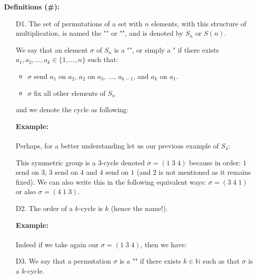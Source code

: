 	 \textbf{Definitions (\#\mydef):}
	 \begin{enumerate}
		\item[D1.] The set of permutations of a set with $n$ elements, with this structure of multiplication, is named the "" or "", and is denoted by $S_n$ or $S(n)$.
		
		We say that an element $\sigma$  of $S_n$ is a "", or simply a " if there exists $a_1,a_2,...,a_k\in \{1,...,n\}$ such that:
		\begin{itemize}
			\item $\sigma$ send $a_1$ on $a_2$, $a_2$ on $a_3$, ..., $a_{k-1}$, and $a_k$ on $a_1$.

			\item $\sigma$ fix all other elements of $S_n$
		\end{itemize}
		and we denote the cycle as following:
		
		\begin{tcolorbox}[colframe=black,colback=white,sharp corners]
		\textbf{{\Large {}}Example:}\\\\
		Perhaps, for a better understanding let us our previous example of $S_4$:
		
		This symmetric group is a $3$-cycle denoted $\sigma=(1\; 3\; 4)$ because in order: $1$ send on $3$, 3 send on $4$ and $4$ send on $1$ (and $2$ is not mentioned as it remains fixed). We can also write this in the following equivalent ways: $\sigma=(3\; 4\; 1)$ or also $\sigma=(4\; 1\; 3)$.
		\end{tcolorbox}

		\item[D2.] The order of a $k$-cycle is $k$ (hence the name!).
		\begin{tcolorbox}[colframe=black,colback=white,sharp corners]
		\textbf{{\Large {}}Example:}\\\\
		Indeed if we take again our $\sigma=(1\; 3\; 4)$, then we have:
		
		\end{tcolorbox}

		\item[D3.] We say that a permutation $\sigma$ is a "" if there exists $k\in \mathbb{N}$ such as that $\sigma$ is a $k$-cycle.
		

\end{enumerate}

